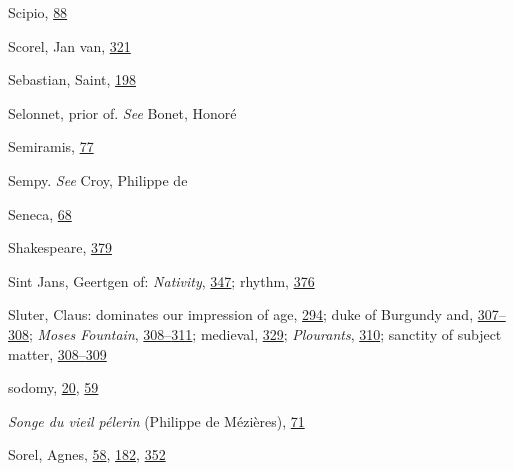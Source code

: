 Scipio,
\protect\hyperlink{10_Chapter_Three__THE_HEROIC_DREAM.xhtmlux5cux23page_88}{88}

Scorel, Jan van,
\protect\hyperlink{20_ILLUSTRATIONS_FOLLOW_PAGE.xhtmlux5cux23page_321}{321}

Sebastian, Saint,
\protect\hyperlink{13_Chapter_Six__THE_DEPICTION_OF_TH.xhtmlux5cux23page_198}{198}

Selonnet, prior of. \emph{See} Bonet, Honoré

Semiramis,
\protect\hyperlink{10_Chapter_Three__THE_HEROIC_DREAM.xhtmlux5cux23page_77}{77}

Sempy. \emph{See} Croy, Philippe de

Seneca,
\protect\hyperlink{10_Chapter_Three__THE_HEROIC_DREAM.xhtmlux5cux23page_68}{68}

Shakespeare,
\protect\hyperlink{21_Chapter_Thirteen__IMAGE_AND_WORD.xhtmlux5cux23page_379}{379}

Sint Jans, Geertgen of: \emph{Nativity},
\protect\hyperlink{21_Chapter_Thirteen__IMAGE_AND_WORD.xhtmlux5cux23page_347}{347};
rhythm,
\protect\hyperlink{21_Chapter_Thirteen__IMAGE_AND_WORD.xhtmlux5cux23page_376}{376}

Sluter, Claus: dominates our impression of age,
\protect\hyperlink{19_Chapter_Twelve__ART_IN_LIFE.xhtmlux5cux23page_294}{294};
duke of Burgundy and,
\protect\hyperlink{20_ILLUSTRATIONS_FOLLOW_PAGE.xhtmlux5cux23page_307}{307--}\protect\hyperlink{20_ILLUSTRATIONS_FOLLOW_PAGE.xhtmlux5cux23page_308}{308};
\emph{Moses Fountain},
\protect\hyperlink{20_ILLUSTRATIONS_FOLLOW_PAGE.xhtmlux5cux23page_308}{308--}\protect\hyperlink{20_ILLUSTRATIONS_FOLLOW_PAGE.xhtmlux5cux23page_311}{311};
medieval,
\protect\hyperlink{21_Chapter_Thirteen__IMAGE_AND_WORD.xhtmlux5cux23page_329}{329};
\emph{Plourants},
\protect\hyperlink{20_ILLUSTRATIONS_FOLLOW_PAGE.xhtmlux5cux23page_310}{310};
sanctity of subject matter,
\protect\hyperlink{20_ILLUSTRATIONS_FOLLOW_PAGE.xhtmlux5cux23page_308}{308--}\protect\hyperlink{20_ILLUSTRATIONS_FOLLOW_PAGE.xhtmlux5cux23page_309}{309}

sodomy,
\protect\hyperlink{08_Chapter_One__THE_PASSIONATE_INTE.xhtmlux5cux23page_20}{20},
\protect\hyperlink{09_Chapter_Two__THE_CRAVING_FOR_A_M.xhtmlux5cux23page_59}{59}

\emph{Songe du vieil pélerin} (Philippe de Mézières),
\protect\hyperlink{10_Chapter_Three__THE_HEROIC_DREAM.xhtmlux5cux23page_71}{71}

Sorel, Agnes,
\protect\hyperlink{09_Chapter_Two__THE_CRAVING_FOR_A_M.xhtmlux5cux23page_58}{58},
\protect\hyperlink{13_Chapter_Six__THE_DEPICTION_OF_TH.xhtmlux5cux23page_182}{182},
\protect\hyperlink{21_Chapter_Thirteen__IMAGE_AND_WORD.xhtmlux5cux23page_352}{352}

